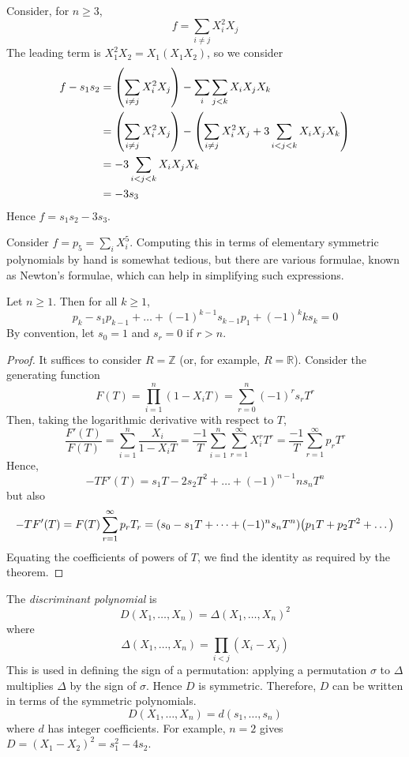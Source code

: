 \begin{example}
	Consider, for \( n \geq 3 \),
	\[ f = \sum_{i\neq j} X_i^2 X_j \]
	The leading term is \( X_1^2 X_2 = X_1 (X_1 X_2) \), so we consider
	\begin{align*}
		f - s_1 s_2 &= \qty(\sum_{i \neq j} X_i^2 X_j) - \sum_i \sum_{j < k} X_i X_j X_k \\
		&= \qty(\sum_{i \neq j} X_i^2 X_j) - \qty(\sum_{i \neq j} X_i^2 X_j + 3 \sum_{i < j < k} X_i X_j X_k) \\
		&= -3 \sum_{i < j < k} X_i X_j X_k \\
		&= -3s_3
	\end{align*}
	Hence \( f = s_1 s_2 - 3 s_3 \).
\end{example}
Consider \( f = p_5 = \sum_i X_i^5 \).
Computing this in terms of elementary symmetric polynomials by hand is somewhat tedious, but there are various formulae, known as Newton's formulae, which can help in simplifying such expressions.
\begin{theorem}
	Let \( n \geq 1 \).
	Then for all \( k \geq 1 \),
	\[ p_k - s_1 p_{k-1} + \dots + (-1)^{k-1} s_{k-1} p_1 + (-1)^k k s_k = 0 \]
	By convention, let \( s_0 = 1 \) and \( s_r = 0 \) if \( r > n \).
\end{theorem}
\begin{proof}
	It suffices to consider \( R = \mathbb Z \) (or, for example, \( R = \mathbb R \)).
	Consider the generating function
	\[ F(T) = \prod_{i=1}^n (1 - X_i T) = \sum_{r=0}^n (-1)^r s_r T^r \]
	Then, taking the logarithmic derivative with respect to \( T \),
	\[ \frac{F'(T)}{F(T)} = \sum_{i=1}^n \frac{X_i}{1 - X_i T} = \frac{-1}{T} \sum_{i=1}^n \sum_{r=1}^\infty X_i^r T^r = \frac{-1}{T} \sum_{r=1}^\infty p_r T^r \]
	Hence,
	\[ -TF'(T) = s_1 T - 2s_2 T^2 + \dots + (-1)^{n-1} n s_n T^n \]
	but also
	\[ -TF'(T) = F(T) \sum_{r=1}^\infty p_r T_r = \qty(s_0 - s_1 T + \dots + (-1)^n s_n T^n) \qty(p_1 T + p_2 T^2 + \dots) \]
	Equating the coefficients of powers of \( T \), we find the identity as required by the theorem.
\end{proof}
\begin{example}
	The \emph{discriminant polynomial} is
	\[ D(X_1, \dots, X_n) = \Delta(X_1, \dots, X_n)^2 \]
	where
	\[ \Delta(X_1, \dots, X_n) = \prod_{i < j} (X_i - X_j) \]
	This is used in defining the sign of a permutation: applying a permutation \( \sigma \) to \( \Delta \) multiplies \( \Delta \) by the sign of \( \sigma \).
	Hence \( D \) is symmetric.
	Therefore, \( D \) can be written in terms of the symmetric polynomials.
	\[ D(X_1, \dots, X_n) = d(s_1, \dots, s_n) \]
	where \( d \) has integer coefficients.
	For example, \( n = 2 \) gives \( D = (X_1 - X_2)^2 = s_1^2 - 4s_2 \).
\end{example}

